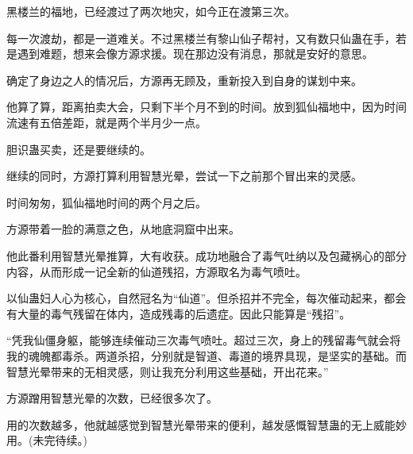 \begin{this_body}
黑楼兰的福地，已经渡过了两次地灾，如今正在渡第三次。

每一次渡劫，都是一道难关。不过黑楼兰有黎山仙子帮衬，又有数只仙蛊在手，若是遇到难题，想来会像方源求援。现在那边没有消息，那就是安好的意思。

确定了身边之人的情况后，方源再无顾及，重新投入到自身的谋划中来。

他算了算，距离拍卖大会，只剩下半个月不到的时间。放到狐仙福地中，因为时间流速有五倍差距，就是两个半月少一点。

胆识蛊买卖，还是要继续的。

继续的同时，方源打算利用智慧光晕，尝试一下之前那个冒出来的灵感。

时间匆匆，狐仙福地时间的两个月之后。

方源带着一脸的满意之色，从地底洞窟中出来。

他此番利用智慧光晕推算，大有收获。成功地融合了毒气吐纳以及包藏祸心的部分内容，从而形成一记全新的仙道残招，方源取名为毒气喷吐。

以仙蛊妇人心为核心，自然冠名为“仙道”。但杀招并不完全，每次催动起来，都会有大量的毒气残留在体内，造成残毒的后遗症。因此只能算是“残招”。

“凭我仙僵身躯，能够连续催动三次毒气喷吐。超过三次，身上的残留毒气就会将我的魂魄都毒杀。两道杀招，分别就是智道、毒道的境界具现，是坚实的基础。而智慧光晕带来的无相灵感，则让我充分利用这些基础，开出花来。”

方源蹭用智慧光晕的次数，已经很多次了。

用的次数越多，他就越感觉到智慧光晕带来的便利，越发感慨智慧蛊的无上威能妙用。(未完待续。)

\end{this_body}

